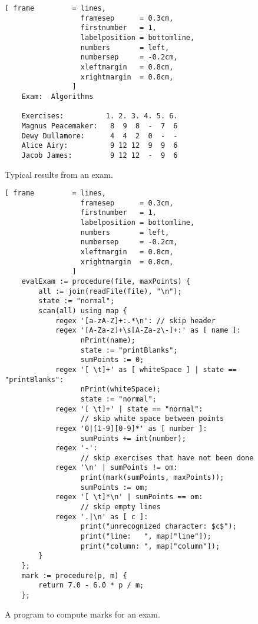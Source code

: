 \begin{figure}[!ht]
\centering
\begin{Verbatim}[ frame         = lines, 
                  framesep      = 0.3cm, 
                  firstnumber   = 1,
                  labelposition = bottomline,
                  numbers       = left,
                  numbersep     = -0.2cm,
                  xleftmargin   = 0.8cm,
                  xrightmargin  = 0.8cm,
                ]
    Exam:  Algorithms
    
    Exercises:          1. 2. 3. 4. 5. 6.
    Magnus Peacemaker:   8  9  8  -  7  6
    Dewy Dullamore:      4  4  2  0  -  -
    Alice Airy:          9 12 12  9  9  6
    Jacob James:         9 12 12  -  9  6
\end{Verbatim}
\vspace*{-0.3cm}
\caption{Typical results from an exam.}
\label{fig:result.txt}
\end{figure}


\begin{figure}[!ht]
\centering
\begin{Verbatim}[ frame         = lines, 
                  framesep      = 0.3cm, 
                  firstnumber   = 1,
                  labelposition = bottomline,
                  numbers       = left,
                  numbersep     = -0.2cm,
                  xleftmargin   = 0.8cm,
                  xrightmargin  = 0.8cm,
                ]
    evalExam := procedure(file, maxPoints) {
        all := join(readFile(file), "\n");
        state := "normal";
        scan(all) using map {
            regex '[a-zA-Z]+:.*\n': // skip header
            regex '[A-Za-z]+\s[A-Za-z\-]+:' as [ name ]:
                  nPrint(name);
                  state := "printBlanks";
                  sumPoints := 0;
            regex '[ \t]+' as [ whiteSpace ] | state == "printBlanks":
                  nPrint(whiteSpace);  
                  state := "normal";
            regex '[ \t]+' | state == "normal": 
                  // skip white space between points
            regex '0|[1-9][0-9]*' as [ number ]:
                  sumPoints += int(number);
            regex '-': 
                  // skip exercises that have not been done  
            regex '\n' | sumPoints != om:
                  print(mark(sumPoints, maxPoints));
                  sumPoints := om;
            regex '[ \t]*\n' | sumPoints == om:
                  // skip empty lines
            regex '.|\n' as [ c ]:
                  print("unrecognized character: $c$");
                  print("line:   ", map["line"]);
                  print("column: ", map["column"]);
        }
    };
    mark := procedure(p, m) {
        return 7.0 - 6.0 * p / m;
    };    
\end{Verbatim}
\vspace*{-0.3cm}
\caption{A program to compute marks for an exam.}
\label{fig:exam.stlx}
\end{figure}

